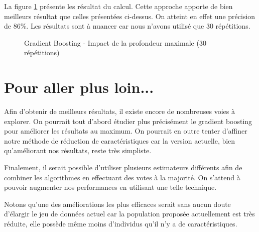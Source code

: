 \documentclass[11pt,a4paper]{article}
\begin{document}
			La figure \ref{gb_estimators} présente les résultat du calcul. Cette approche apporte de bien meilleurs résultat que celles présentées ci-dessus. On atteint en effet une précision de 86\%. Les résultats sont à nuancer car nous n'avons utilisé que 30 répétitions.

			\begin{figure}
				\begin{center}
					\caption{Gradient Boosting - Impact de la profondeur maximale (30 répétitions)}
					\label{gb_estimators}
				\end{center}
			\end{figure}


\section{Pour aller plus loin...}
	Afin d'obtenir de meilleurs résultats, il existe encore de nombreuses voies à explorer. On pourrait tout d'abord étudier plus précisément le gradient boosting pour améliorer les résultats au maximum. On pourrait en outre tenter d'affiner notre méthode de réduction de caractéristiques car la version actuelle, bien qu'améliorant nos résultats, reste très simpliste.

	Finalement, il serait possible d'utiliser plusieurs estimateurs différents afin de combiner les algorithmes en effectuant des votes à la majorité. On s'attend à pouvoir augmenter nos performances en utilisant une telle technique.

	Notons qu'une des améliorations les plus efficaces serait sans aucun doute d'élargir le jeu de données actuel car la population proposée actuellement est très réduite, elle possède même moins d'individus qu'il n'y a de caractéristiques.
\end{document}

